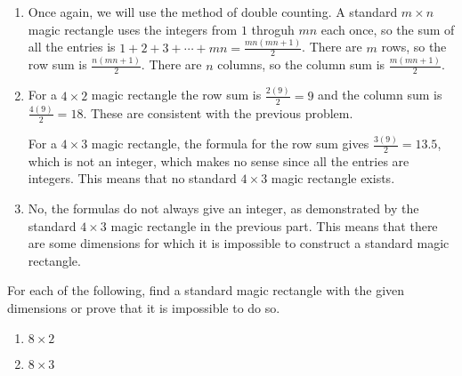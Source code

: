 \documentclass[11pt]{article}
\renewenvironment{problem}{\begin{problems}}{\end{problems}\vspace{5pt}}
\begin{document}
\begin{solution}
\begin{enumerate}[label=(\alph*)]
\item Once again, we will use the method of double counting. A standard $m \times n$ magic rectangle
uses the integers from $1$ throguh $mn$ each once, so the sum of all the entries is 
$1 + 2 + 3 + \cdots + mn = \frac{mn(mn+1)}{2}$. There are $m$ rows, so the row sum is $\boxed{\frac{n(mn+1)}{2}}$.
There are $n$ columns, so the column sum is $\boxed{\frac{m(mn+1)}{2}}$.

\item For a $4 \times 2$ magic rectangle the row sum is $\frac{2(9)}{2} = \boxed{9}$ and the column sum is
$\frac{4(9)}{2} = \boxed{18}$. These are consistent with the previous problem.

For a $4 \times 3$ magic rectangle, the formula for the row sum gives $\frac{3(9)}{2} = 13.5$, which is not
an integer, which makes no sense since all the entries are integers. This means that no standard $4 \times 3$
magic rectangle exists.

\item $\boxed{\text{No}}$, the formulas do not always give an integer, as demonstrated by the standard
$4 \times 3$ magic rectangle in the previous part. This means that there are some dimensions for which
it is impossible to construct a standard magic rectangle.
\end{enumerate}
\end{solution}


\begin{problem}[8=4+4 points]
For each of the following, find a standard magic rectangle with the given dimensions or prove that it is impossible to do so.
\begin{enumerate}[label=(\alph*)]
\item $8 \times 2$

\item $8 \times 3$
\end{enumerate}
\end{problem}
\end{document}

